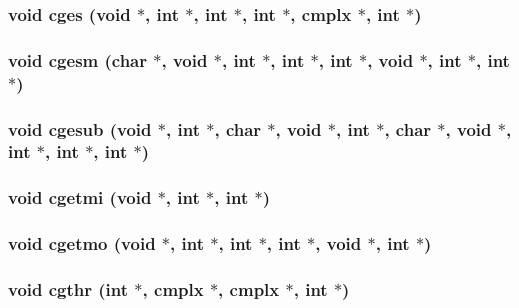 \subsubsection{\setlength{\rightskip}{0pt plus 5cm}void cges (void $\ast$, int $\ast$, int $\ast$, int $\ast$, {\bf cmplx} $\ast$, int $\ast$)}\label{essl_8h_986059c8bbefd93516e1cc444908037f}


\subsubsection{\setlength{\rightskip}{0pt plus 5cm}void cgesm (char $\ast$, void $\ast$, int $\ast$, int $\ast$, int $\ast$, void $\ast$, int $\ast$, int $\ast$)}\label{essl_8h_bceb11f10ea9def7745b70abfcef0b59}


\subsubsection{\setlength{\rightskip}{0pt plus 5cm}void cgesub (void $\ast$, int $\ast$, char $\ast$, void $\ast$, int $\ast$, char $\ast$, void $\ast$, int $\ast$, int $\ast$, int $\ast$)}\label{essl_8h_c5af3bb85c78e56c12d5a1a9929d48a6}


\subsubsection{\setlength{\rightskip}{0pt plus 5cm}void cgetmi (void $\ast$, int $\ast$, int $\ast$)}\label{essl_8h_cda52ed84c4a038ec8b9b8f6e01481e3}


\subsubsection{\setlength{\rightskip}{0pt plus 5cm}void cgetmo (void $\ast$, int $\ast$, int $\ast$, int $\ast$, void $\ast$, int $\ast$)}\label{essl_8h_6b1ff08b4dc4d0bf559aebd0054c7430}


\subsubsection{\setlength{\rightskip}{0pt plus 5cm}void cgthr (int $\ast$, {\bf cmplx} $\ast$, {\bf cmplx} $\ast$, int $\ast$)}\label{essl_8h_308c2118428ca29ee525cb75662610d1}


